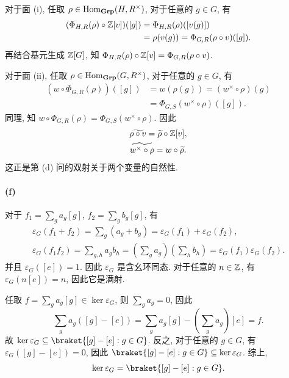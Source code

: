 \documentclass{article}
\begin{document}
\begin{solution}
	对于面 (i), 任取 $\rho \in \operatorname{Hom}_{\mathbf{Grp}}(H, R^\times)$, 对于任意的 $g \in G$, 有
	\begin{align*}
		(\Phi_{H, R}(\rho) \circ \mathbb{Z}[v])([g])
		&= \Phi_{H, R}(\rho)([v(g)]) \\
		&= \rho(v(g)) = \Phi_{G, R}(\rho \circ v)([g]).
	\end{align*}
	再结合基元生成 $\mathbb{Z}[G]$, 知 $\Phi_{H, R}(\rho) \circ \mathbb{Z}[v] = \Phi_{G, R}(\rho \circ v)$.

	对于面 (ii), 任取 $\rho \in \operatorname{Hom}_{\mathbf{Grp}}(G, R^\times)$, 对于任意的 $g \in G$, 有
	\begin{align*}
		(w \circ \Phi_{G, R}(\rho))([g])
		&= w(\rho(g)) = (w^\times \circ \rho)(g) \\
		&= \Phi_{G, S}(w^\times \circ \rho)([g]).
	\end{align*}
	同理, 知 $w \circ \Phi_{G, R}(\rho) = \Phi_{G, S}(w^\times \circ \rho)$. 因此
	\begin{gather*}
		\widetilde{\rho \circ v} = \widetilde{\rho} \circ \mathbb{Z}[v], \\
		\widetilde{w^\times \circ \rho} = w \circ \widetilde{\rho}.
	\end{gather*}
	这正是第 (d) 问的双射关于两个变量的自然性.

	\paragraph{(f)} 对于 $f_1 = \sum_g a_g[g]$, $f_2 = \sum_g b_g[g]$, 有
	\begin{gather*}
		\varepsilon_G(f_1 + f_2) = \sum_g(a_g + b_g)
		= \varepsilon_G(f_1) + \varepsilon_G(f_2), \\
		\varepsilon_G(f_1f_2) = \sum_{g,h}a_gb_h
		= \left(\sum_g a_g\right)\left(\sum_h b_h\right)
		= \varepsilon_G(f_1)\varepsilon_G(f_2).
	\end{gather*}
	并且 $\varepsilon_G([e]) = 1$. 因此 $\varepsilon_G$ 是含幺环同态. 对于任意的 $n \in \mathbb{Z}$, 有 $\varepsilon_G(n[e]) = n$, 因此它是满射.

	任取 $f = \sum_g a_g[g] \in \ker\varepsilon_G$, 则 $\sum_g a_g = 0$, 因此
	\[ \sum_g a_g([g] - [e]) = \sum_g a_g[g] - \left(\sum_g a_g\right)[e] = f. \]
	故 $\ker\varepsilon_G \subseteq \braket{[g] - [e]: g \in G}$. 反之, 对于任意的 $g \in G$, 有 $\varepsilon_G([g] - [e]) = 0$, 因此 $\braket{[g] - [e]: g \in G} \subseteq \ker\varepsilon_G$. 综上,
	\[ \ker\varepsilon_G = \braket{[g] - [e]: g \in G}. \]


\end{solution}
\end{document}
